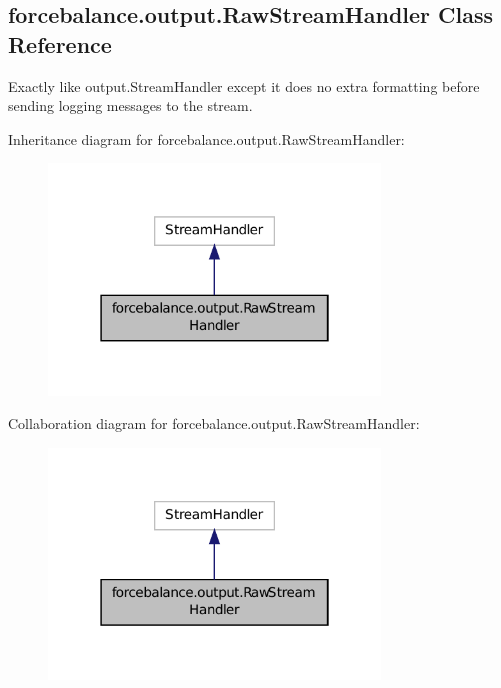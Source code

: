 \hypertarget{classforcebalance_1_1output_1_1RawStreamHandler}{\subsection{forcebalance.\-output.\-Raw\-Stream\-Handler Class Reference}
\label{classforcebalance_1_1output_1_1RawStreamHandler}
}


Exactly like output.\-Stream\-Handler except it does no extra formatting before sending logging messages to the stream.  




Inheritance diagram for forcebalance.\-output.\-Raw\-Stream\-Handler\-:\nopagebreak
\begin{figure}[H]
\begin{center}
\leavevmode
\includegraphics[width=250pt]{classforcebalance_1_1output_1_1RawStreamHandler__inherit__graph}
\end{center}
\end{figure}


Collaboration diagram for forcebalance.\-output.\-Raw\-Stream\-Handler\-:\nopagebreak
\begin{figure}[H]
\begin{center}
\leavevmode
\includegraphics[width=250pt]{classforcebalance_1_1output_1_1RawStreamHandler__coll__graph}
\end{center}
\end{figure}
